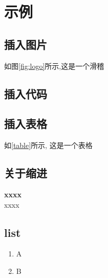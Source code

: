 
\section{示例}

\subsection{插入图片}
如图\ref{fig:logo}所示,这是一个滑稽\\

\subsection{插入代码}

\subsection{插入表格}
如\ref{table}所示, 这是一个表格


\subsection{关于缩进}
\indent \textbf{xxxx}\\
\noindent xxxx

\subsection{list}
\begin{enumerate}
	\item A
	\item B
\end{enumerate}
